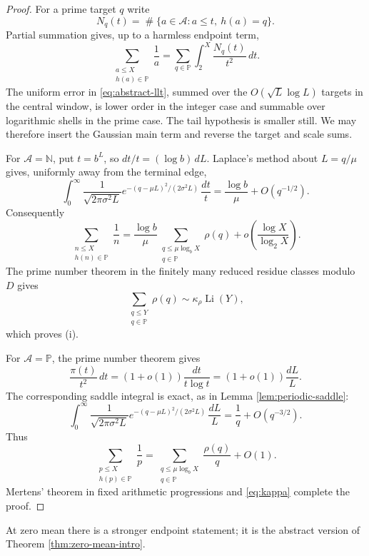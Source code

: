 \documentclass[11pt,reqno]{amsart}
\theoremstyle{plain}
\theoremstyle{definition}
\newcommand{\N}{\mathbb{N}}
\newcommand{\Pp}{\mathbb{P}}
\newcommand{\1}{\mathbf 1}
\DeclareMathOperator{\Card}{\#}
\DeclareMathOperator{\Li}{Li}
\begin{document}
\begin{proof}
For a prime target $q$ write
\[
 N_q(t)=\Card\{a\in\mathcal A:a\le t,\ h(a)=q\}.
\]
Partial summation gives, up to a harmless endpoint term,
\[
 \sum_{\substack{a\le X\\h(a)\in\Pp}}\frac1a
 =\sum_{q\in\Pp}\int_2^X\frac{N_q(t)}{t^2}\,dt.
\]
The uniform error in \eqref{eq:abstract-llt}, summed over the $O(\sqrt L\log L)$ targets in the central window, is lower order in the integer case and summable over logarithmic shells in the prime case.  The tail hypothesis is smaller still.  We may therefore insert the Gaussian main term and reverse the target and scale sums.

For $\mathcal A=\N$, put $t=b^L$, so $dt/t=(\log b)\,dL$.  Laplace's method about $L=q/\mu$ gives, uniformly away from the terminal edge,
\begin{equation}\label{eq:integer-laplace}
 \int_0^\infty
 \frac{1}{\sqrt{2\pi\sigma^2L}}
 e^{-(q-\mu L)^2/(2\sigma^2L)}\,\frac{dt}{t}
 =\frac{\log b}{\mu}+O(q^{-1/2}).
\end{equation}
Consequently
\[
 \sum_{\substack{n\le X\\h(n)\in\Pp}}\frac1n
 =\frac{\log b}{\mu}
 \sum_{\substack{q\le\mu\log_bX\\q\in\Pp}}\rho(q)
 +o\left(\frac{\log X}{\log_2X}\right).
\]
The prime number theorem in the finitely many reduced residue classes modulo $D$ gives
\[
 \sum_{\substack{q\le Y\\q\in\Pp}}\rho(q)
 \sim\kappa_\rho\Li(Y),
\]
which proves (i).

For $\mathcal A=\Pp$, the prime number theorem gives
\[
 \frac{\pi(t)}{t^2}\,dt=(1+o(1))\frac{dt}{t\log t}=(1+o(1))\frac{dL}{L}.
\]
The corresponding saddle integral is exact, as in Lemma \ref{lem:periodic-saddle}:
\begin{equation}\label{eq:prime-laplace}
 \int_0^\infty
 \frac{1}{\sqrt{2\pi\sigma^2L}}
 e^{-(q-\mu L)^2/(2\sigma^2L)}\,\frac{dL}{L}
 =\frac1q+O(q^{-3/2}).
\end{equation}
Thus
\[
 \sum_{\substack{p\le X\\h(p)\in\Pp}}\frac1p
 =\sum_{\substack{q\le\mu\log_bX\\q\in\Pp}}\frac{\rho(q)}q+O(1).
\]
Mertens' theorem in fixed arithmetic progressions and \eqref{eq:kappa} complete the proof.
\end{proof}

At zero mean there is a stronger endpoint statement; it is the abstract version of Theorem \ref{thm:zero-mean-intro}.
\end{document}

